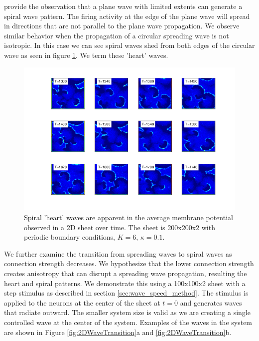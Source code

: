 \documentclass[12pt]{article}
\begin{document}
\parencite{Huang2010} provide the observation that a plane wave with limited extents can generate a spiral wave pattern.
The firing activity at the edge of the plane wave will spread in directions that are not parallel to the plane wave propagation.
We observe similar behavior when the propagation of a circular spreading wave is not isotropic.
In this case we can see spiral waves shed from both edges of the circular wave as seen in figure \ref{fig:2DHeartWaves}.
We term these 'heart' waves.
\begin{figure}[!htb]
 \caption{ Spiral 'heart' waves are apparent in the average membrane potential observed in a 2D sheet over time. 
           The sheet is 200x200x2 with periodic boundary conditions, $K=6$, $\kappa=0.1$.
           }
 \label{fig:2DHeartWaves}
 \centering
   \includegraphics[width=\textwidth]{fig/2DSpiralWaves_HeartWaves}
\end{figure}
\FloatBarrier

We further examine the transition from spreading waves to spiral waves as connection strength decreases.
We hypothesize that the lower connection strength creates anisotropy that can disrupt a spreading wave propagation, resulting the heart and spiral patterns. 
We demonstrate this using a 100x100x2 sheet with a step stimulus as described in section \ref{sec:wave_speed_method}.
The stimulus is applied to the neurons at the center of the sheet at $t=0$ and generates waves that radiate outward.
The smaller system size is valid as we are creating a single controlled wave at the center of the system.
Examples of the waves in the system are shown in Figure \ref{fig:2DWaveTransition}a and \ref{fig:2DWaveTransition}b.
\end{document}
